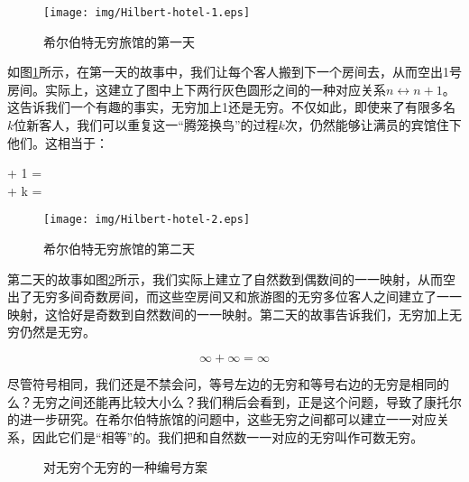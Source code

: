 \documentclass{article}
\begin{document}
\begin{figure}[htbp]
 \centering
 \texttt{[image: img/Hilbert-hotel-1.eps]}
 \caption{希尔伯特无穷旅馆的第一天}
 \label{fig:Hilbert-hotel-1}
\end{figure}

如图\ref{fig:Hilbert-hotel-1}所示，在第一天的故事中，我们让每个客人搬到下一个房间去，从而空出1号房间。实际上，这建立了图中上下两行灰色圆形之间的一种对应关系$n \leftrightarrow n+1$。这告诉我们一个有趣的事实，无穷加上1还是无穷。不仅如此，即使来了有限多名$k$位新客人，我们可以重复这一“腾笼换鸟”的过程$k$次，仍然能够让满员的宾馆住下他们。这相当于：

\bean
\infty + 1 = \infty \\
\infty + k = \infty \\
\eean

\begin{figure}[htbp]
 \centering
 \texttt{[image: img/Hilbert-hotel-2.eps]}
 \caption{希尔伯特无穷旅馆的第二天}
 \label{fig:Hilbert-hotel-2}
\end{figure}

第二天的故事如图\ref{fig:Hilbert-hotel-2}所示，我们实际上建立了自然数到偶数间的一一映射，从而空出了无穷多间奇数房间，而这些空房间又和旅游图的无穷多位客人之间建立了一一映射，这恰好是奇数到自然数间的一一映射。第二天的故事告诉我们，无穷加上无穷仍然是无穷。

\[
\infty + \infty = \infty
\]

尽管符号相同，我们还是不禁会问，等号左边的无穷和等号右边的无穷是相同的么？无穷之间还能再比较大小么？我们稍后会看到，正是这个问题，导致了康托尔的进一步研究。在希尔伯特旅馆的问题中，这些无穷之间都可以建立一一对应关系，因此它们是“相等”的。我们把和自然数一一对应的无穷叫作可数无穷。

\begin{figure}[htbp]
\centering
{}
\caption{对无穷个无穷的一种编号方案}
\label{fig:NNtoN}
\end{figure}
\end{document}

